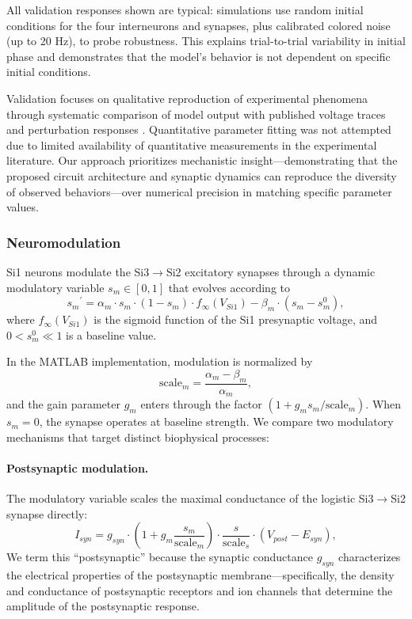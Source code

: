 All validation responses shown are typical: simulations use random initial conditions for the four interneurons and synapses, plus calibrated colored noise (up to 20 Hz), to probe robustness.
This explains trial-to-trial variability in initial phase and demonstrates that the model's behavior is not dependent on specific initial conditions.

Validation focuses on qualitative reproduction of experimental phenomena through systematic comparison of model output with published voltage traces and perturbation responses \cite{SakuraiKatz2016, sakurai2019command, sakurai2022bursting}.
Quantitative parameter fitting was not attempted due to limited availability of quantitative measurements in the experimental literature.
Our approach prioritizes mechanistic insight---demonstrating that the proposed circuit architecture and synaptic dynamics can reproduce the diversity of observed behaviors---over numerical precision in matching specific parameter values.


\subsubsection*{Neuromodulation}

Si1 neurons modulate the Si3$\to$Si2 excitatory synapses through a dynamic modulatory variable $s_m \in [0, 1]$ that evolves according to
\begin{equation}
{s_m}^\prime = \alpha_m \cdot s_m \cdot (1 - s_m) \cdot f_{\infty}(V_{Si1}) - \beta_m \cdot (s_m - s_{m}^0),
\end{equation}
where $f_{\infty}(V_{Si1})$ is the sigmoid function of the Si1 presynaptic voltage, and $0 < s_m^0 \ll 1$ is a baseline value.

In the MATLAB implementation, modulation is normalized by
\begin{equation}
\text{scale}_m = \frac{\alpha_m - \beta_m}{\alpha_m},
\end{equation}
and the gain parameter $g_m$ enters through the factor $(1 + g_m s_m / \text{scale}_m)$.
When $s_m = 0$, the synapse operates at baseline strength.
We compare two modulatory mechanisms that target distinct biophysical processes:

\paragraph{Postsynaptic modulation.}
The modulatory variable scales the maximal conductance of the logistic Si3$\to$Si2 synapse directly:
\begin{equation}
I_{syn} = g_{syn} \cdot \left(1 + g_m \frac{s_m}{\text{scale}_m}\right) \cdot \frac{s}{\text{scale}_s} \cdot (V_{post} - E_{syn}),
\end{equation}
We term this ``postsynaptic'' because the synaptic conductance $g_{syn}$ characterizes the electrical properties of the postsynaptic membrane---specifically, the density and conductance of postsynaptic receptors and ion channels that determine the amplitude of the postsynaptic response.

